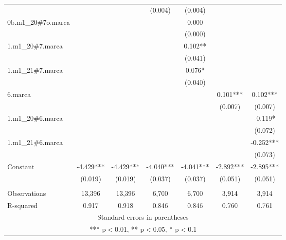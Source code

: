 \begin{longtable}{lcccccc}
 &  &  & (0.004) & (0.004) &  &  \\
0b.m1\_20\#7o.marca &  &  &  & 0.000 &  &  \\
 &  &  &  & (0.000) &  &  \\
1.m1\_20\#7.marca &  &  &  & 0.102** &  &  \\
 &  &  &  & (0.041) &  &  \\
1.m1\_21\#7.marca &  &  &  & 0.076* &  &  \\
 &  &  &  & (0.040) &  &  \\
6.marca &  &  &  &  & 0.101*** & 0.102*** \\
 &  &  &  &  & (0.007) & (0.007) \\
1.m1\_20\#6.marca &  &  &  &  &  & -0.119* \\
 &  &  &  &  &  & (0.072) \\
1.m1\_21\#6.marca &  &  &  &  &  & -0.252*** \\
 &  &  &  &  &  & (0.073) \\
Constant & -4.429*** & -4.429*** & -4.040*** & -4.041*** & -2.892*** & -2.895*** \\
 & (0.019) & (0.019) & (0.037) & (0.037) & (0.051) & (0.051) \\
 &  &  &  &  &  &  \\
Observations & 13,396 & 13,396 & 6,700 & 6,700 & 3,914 & 3,914 \\
 R-squared & 0.917 & 0.918 & 0.846 & 0.846 & 0.760 & 0.761 \\ \hline
\multicolumn{7}{c}{ Standard errors in parentheses} \\
\multicolumn{7}{c}{ *** p$<$0.01, ** p$<$0.05, * p$<$0.1} \\
\end{longtable}
